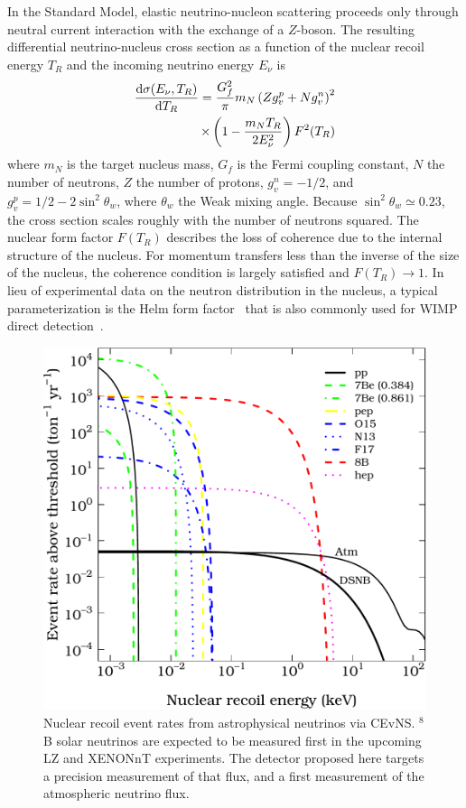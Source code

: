 In the Standard Model, elastic neutrino-nucleon scattering proceeds only through neutral current interaction with the exchange of a $Z$-boson. The resulting differential neutrino-nucleus cross section as a function of the nuclear recoil energy $T_R$ and the incoming neutrino energy $E_\nu$ is
\begin{equation}
\begin{split}
\frac{{\rm d}\sigma(E_\nu, T_R)}{{\rm d}T_R} = \frac{G^2_f}{\pi} m_N  \left( Z g_v^p + N g_v^n \right)^2 \\
\times \left(1 - \frac{m_NT_R}{2E^2_{\nu}}
\right) F^2(T_R)
\end{split}
\end{equation}
where $m_N$ is the target nucleus mass, $G_f$ is the Fermi coupling constant, $N$ the number of neutrons, $Z$ the number of protons, $g_v^n = -1/2$, and $g_v^p = 1/2 - 2 \sin^2 \theta_w$, where $\theta_w$ the Weak mixing angle. Because $\sin^2{\theta_w}\simeq 0.23$, the cross section scales roughly with the number of neutrons squared. The nuclear form factor $F(T_R)$ describes the loss of coherence due to the internal structure of the nucleus. For momentum transfers less than the inverse of the size of the nucleus, the coherence condition is largely satisfied and $F(T_R) \rightarrow 1$. In lieu of experimental data on the neutron distribution in the nucleus, a typical parameterization is the Helm form factor~\cite{Helm:1956zz} that is also commonly used for WIMP direct detection~\cite{Engel:1991wq, Lewin:1995rx}.

\begin{figure}[!htbp]
\begin{center}
   \includegraphics[width=0.99\columnwidth]{fig_nurates.pdf}
   \caption{Nuclear recoil event rates from astrophysical neutrinos via CEvNS. $^8$B solar neutrinos are expected to be measured first in the upcoming LZ and XENONnT experiments. The detector proposed here targets a precision measurement of that flux, and a first measurement of the atmospheric neutrino flux.}\label{fig:nurates}
\end{center}
\end{figure}

